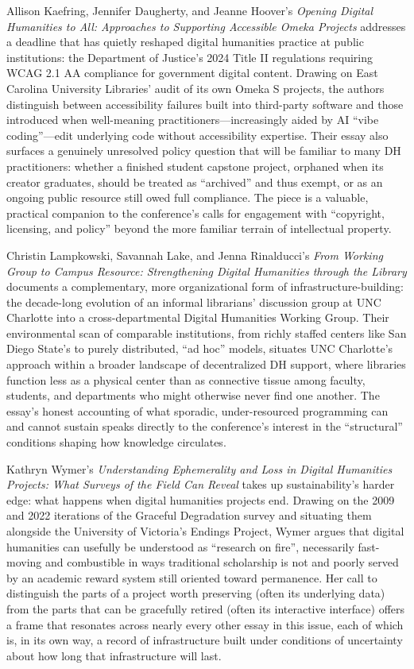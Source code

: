 \documentclass[final]{anthology-ch}  %
\begin{document}
Allison Kaefring, Jennifer Daugherty, and Jeanne Hoover's \textit{Opening Digital Humanities to All: Approaches to Supporting Accessible Omeka Projects} addresses a deadline that has quietly reshaped digital humanities practice at public institutions: the Department of Justice's 2024 Title II regulations requiring WCAG 2.1 AA compliance for government digital content. Drawing on East Carolina University Libraries' audit of its own Omeka S projects, the authors distinguish between accessibility failures built into third-party software and those introduced when well-meaning practitioners---increasingly aided by AI \enquote{vibe coding}---edit underlying code without accessibility expertise. Their essay also surfaces a genuinely unresolved policy question that will be familiar to many DH practitioners: whether a finished student capstone project, orphaned when its creator graduates, should be treated as \enquote{archived} and thus exempt, or as an ongoing public resource still owed full compliance. The piece is a valuable, practical companion to the conference's calls for engagement with \enquote{copyright, licensing, and policy} beyond the more familiar terrain of intellectual property.

Christin Lampkowski, Savannah Lake, and Jenna Rinalducci's \textit{From Working Group to Campus Resource: Strengthening Digital Humanities through the Library} documents a complementary, more organizational form of infrastructure-building: the decade-long evolution of an informal librarians' discussion group at UNC Charlotte into a cross-departmental Digital Humanities Working Group. Their environmental scan of comparable institutions, from richly staffed centers like San Diego State's to purely distributed, \enquote{ad hoc} models, situates UNC Charlotte's approach within a broader landscape of decentralized DH support, where libraries function less as a physical center than as connective tissue among faculty, students, and departments who might otherwise never find one another. The essay's honest accounting of what sporadic, under-resourced programming can and cannot sustain speaks directly to the conference's interest in the \enquote{structural} conditions shaping how knowledge circulates.

Kathryn Wymer's \textit{Understanding Ephemerality and Loss in Digital Humanities Projects: What Surveys of the Field Can Reveal} takes up sustainability's harder edge: what happens when digital humanities projects end. Drawing on the 2009 and 2022 iterations of the Graceful Degradation survey and situating them alongside the University of Victoria's Endings Project, Wymer argues that digital humanities can usefully be understood as \enquote{research on fire}, necessarily fast-moving and combustible in ways traditional scholarship is not and poorly served by an academic reward system still oriented toward permanence. Her call to distinguish the parts of a project worth preserving (often its underlying data) from the parts that can be gracefully retired (often its interactive interface) offers a frame that resonates across nearly every other essay in this issue, each of which is, in its own way, a record of infrastructure built under conditions of uncertainty about how long that infrastructure will last.
\end{document}
